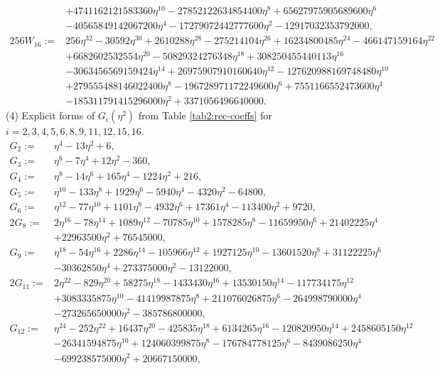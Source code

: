 \documentclass[11pt,a4paper]{article}
\numberwithin{equation}{section}
\begin{document}
{\begin{appendices}
\begin{align*}
&+4741162121583360\eta^{10}-27852122634854400\eta^8+65627975905689600\eta^6\\
&-40565849142067200\eta^4-17279072442777600\eta^2-12917032353792000,\\
256W_{16}:=&256\eta^{32}-30592\eta^{30}+2610288 \eta^{28}-275214104\eta^{26}+16234800485 \eta^{24}-466147159164\eta^{22}\\
&+6682602532554 \eta^{20}-50829324276348\eta^{18}+308250455440113 \eta^{16}\\
&-3063456569159424\eta^{14}+26975907910160640 \eta^{12}-127620988169748480 \eta^{10}\\
&+279555488146022400\eta^8-196728971172249600\eta^6+7551166552473600\eta^4\\
&-185311791415296000 \eta^2+3371056496640000.
\end{align*}
(4) Explicit forms of $G_i(\eta^2)$ from Table \ref{tab2:rec-coeffs} for $i=2,3,4,5,6,8,9,11,12,15,16$.
\begin{align*}
G_{2}:=&\eta^4-13\eta^2+6,\\
G_{3}:=&\eta^6-7\eta^4+12\eta^2-360,\\
G_{4}:=&\eta^8-14\eta^6+165\eta^4-1224\eta^2+216,\\
G_{5}:=&\eta^{10}-133\eta^8+1929\eta^6-5940\eta^4-4320\eta^2-64800,\\	 G_{6}:=&\eta^{12}-77\eta^{10}+1101\eta^8-4932\eta^6+17361\eta^4-113400\eta^2+9720,\\	 2G_{8}:=&2\eta^{16}-78\eta^{14}+1089 \eta^{12}-70785\eta^{10}+1578285\eta^8-11659950 \eta^6+21402225 \eta^4\\
&+22963500\eta^2+76545000,\\
G_{9}:=&\eta^{18}-54 \eta^{16}+2286\eta^{14}-105966\eta^{12}+1927125\eta^{10}-13601520 \eta^8+31122225 \eta^6\\
&-30362850\eta^4+273375000\eta^2-13122000,\\
2G_{11}:=&2\eta^{22}-829\eta^{20}+58275\eta^{18}-1433430\eta^{16}+13530150\eta^{14}-117734175\eta^{12}\\
&+3083335875\eta^{10}-41419987875\eta^8+211076026875\eta^6-264998790000\eta^4\\
&-273265650000\eta^2-385786800000,\\
G_{12}:=&\eta^{24}-252\eta^{22}+16437\eta^{20}-425835\eta^{18}+6134265\eta^{16}-120820950\eta^{14}+2458605150\eta^{12}\\
&-26341594875\eta^{10}+124060399875\eta^8-176784778125\eta^6-8439086250\eta^4\\
&-699238575000\eta^2+20667150000,\\

\end{align*}
\end{appendices}}
\end{document}

